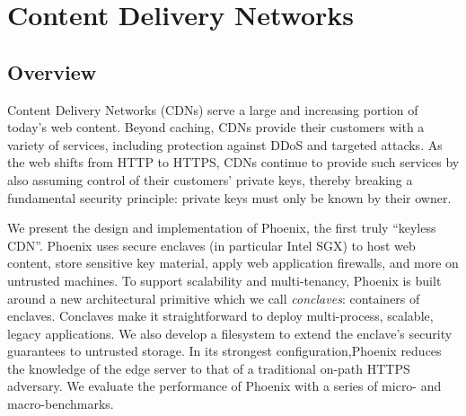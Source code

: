 \section{Content Delivery Networks}
\label{sec:cdn}

\subsection{Overview}

Content Delivery Networks (CDNs) serve a large and increasing portion of
today's web content.
%
Beyond caching, CDNs provide their customers with a variety of services,
including protection against DDoS and targeted attacks.
%
%
As the web shifts from HTTP to HTTPS, CDNs continue to provide such services by
also assuming control of their customers' private keys, thereby breaking a
fundamental security principle: private keys must only be known by their owner.

We present the design and implementation of Phoenix, the first truly ``keyless
CDN''.  Phoenix uses secure enclaves (in particular Intel SGX) to host web
content, store sensitive key material, apply web application firewalls, and
more on untrusted machines.  To support scalability and multi-tenancy, Phoenix
is built around a new architectural primitive which we call \emph{conclaves}:
containers of enclaves.  Conclaves make it straightforward to deploy
multi-process, scalable, legacy applications.
%
We also develop a filesystem to extend the enclave's security
guarantees to untrusted storage. In its strongest configuration,Phoenix
reduces the knowledge of the edge server to that of a traditional on-path HTTPS
adversary. We evaluate the performance of Phoenix with a series of micro- and
macro-benchmarks.



